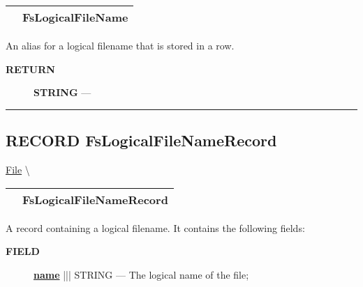 {\renewcommand{\arraystretch}{1.5}
\begin{tabularx}{\textwidth}{|>{\raggedright\arraybackslash}l|X|}
\hline
\hspace{0pt}\mytexttt{\color{red} } & \textbf{FsLogicalFileName} \\
\hline
\end{tabularx}
}

\par





An alias for a logical filename that is stored in a row.








\par
\begin{description}
\item [\colorbox{tagtype}{\color{white} \textbf{\textsf{RETURN}}}] \textbf{STRING} --- 
\end{description}




\rule{\linewidth}{0.5pt}
\subsection*{\textsf{\colorbox{headtoc}{\color{white} RECORD}
FsLogicalFileNameRecord}}

\hypertarget{ecldoc:file.fslogicalfilenamerecord}{}
\hspace{0pt} \hyperlink{ecldoc:File}{File} \textbackslash 

{\renewcommand{\arraystretch}{1.5}
\begin{tabularx}{\textwidth}{|>{\raggedright\arraybackslash}l|X|}
\hline
\hspace{0pt}\mytexttt{\color{red} } & \textbf{FsLogicalFileNameRecord} \\
\hline
\end{tabularx}
}

\par





A record containing a logical filename. It contains the following fields:







\par
\begin{description}
\item [\colorbox{tagtype}{\color{white} \textbf{\textsf{FIELD}}}] \textbf{\underline{name}} ||| STRING --- The logical name of the file;
\end{description}





